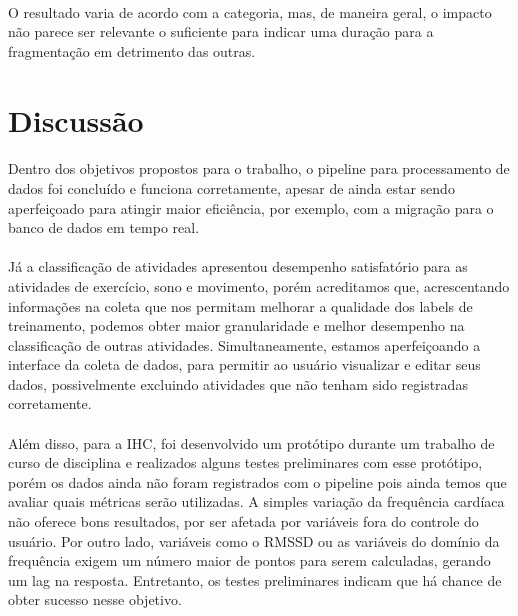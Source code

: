              \paragraph{} O resultado varia de acordo com a categoria, mas, de maneira geral, o impacto não parece ser relevante o suficiente para indicar uma duração para a fragmentação em detrimento das outras.

    \section{Discussão}
    \label{Dicussion}
    
        \paragraph{} Dentro dos objetivos propostos para o trabalho, o pipeline para processamento de dados foi concluído e funciona corretamente, apesar de ainda estar sendo aperfeiçoado para atingir maior eficiência, por exemplo, com a migração para o banco de dados em tempo real.
    
        \paragraph{} Já a classificação de atividades apresentou desempenho satisfatório para as atividades de exercício, sono e movimento, porém acreditamos que, acrescentando informações na coleta que nos permitam melhorar a qualidade dos labels de treinamento, podemos obter maior granularidade e melhor desempenho na classificação de outras atividades. Simultaneamente, estamos aperfeiçoando a interface da coleta de dados, para permitir ao usuário visualizar e editar seus dados, possivelmente excluindo atividades que não tenham sido registradas corretamente.
        
        \paragraph{} Além disso, para a IHC, foi desenvolvido um protótipo durante um trabalho de curso de disciplina e realizados alguns testes preliminares com esse protótipo, porém os dados ainda não foram registrados com o pipeline pois ainda temos que avaliar quais métricas serão utilizadas. A simples variação da frequência cardíaca não oferece bons resultados, por ser afetada por variáveis fora do controle do usuário. Por outro lado, variáveis como o RMSSD ou as variáveis do domínio da frequência exigem um número maior de pontos para serem calculadas, gerando um lag na resposta. Entretanto, os testes preliminares indicam que há chance de obter sucesso nesse objetivo.